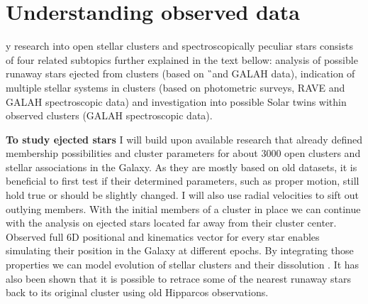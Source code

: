 \section{Understanding observed data}
y research into open stellar clusters and spectroscopically peculiar stars consists of four related subtopics further explained in the text bellow: analysis of possible runaway stars ejected from clusters (based on \G\ and GALAH data), indication of multiple stellar systems in clusters (based on photometric surveys, RAVE and GALAH spectroscopic data) and investigation into possible Solar twins within observed clusters (GALAH spectroscopic data).

\textbf{To study ejected stars} I will build upon available research that already defined membership possibilities and cluster parameters for about 3000 open clusters and stellar associations \cite{2013A&A...558A..53K} in the Galaxy. As they are mostly based on old datasets, it is beneficial to first test if their determined parameters, such as proper motion, still hold true or should be slightly changed. I will also use radial velocities to sift out outlying members. With the initial members of a cluster in place we can continue with the analysis on ejected stars located far away from their cluster center. Observed full 6D positional and kinematics vector for every star enables simulating their position in the Galaxy at different epochs. By integrating those properties we can model evolution of stellar clusters and their dissolution \cite{1998A&A...337..363P}. It has also been shown \cite{2000ApJ...544L.133H} that it is possible to retrace some of the nearest runaway stars back to its original cluster using old Hipparcos observations.

